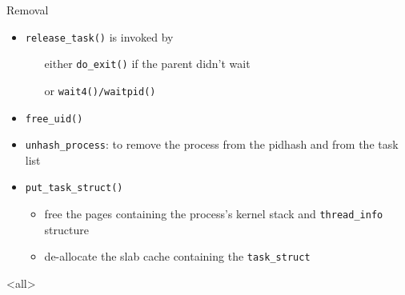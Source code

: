 \begin{frame}
  \begin{block}{Removal}
    \begin{itemize}
    \item \texttt{release\_task()} is invoked by
      \begin{itemize}
      \item[either] \texttt{do\_exit()} if the parent didn't wait
      \item[or] \texttt{wait4()/waitpid()}
      \end{itemize}
    \item \texttt{free\_uid()}
    \item \texttt{unhash\_process}: to remove the process from the pidhash and from the task
      list
    \item \texttt{put\_task\_struct()}
      \begin{itemize}
      \item free the pages containing the process's kernel stack and \texttt{thread\_info}
        structure
      \item de-allocate the slab cache containing the \texttt{task\_struct}
      \end{itemize}
    \end{itemize}
  \end{block}
\end{frame}

\mode<all>
